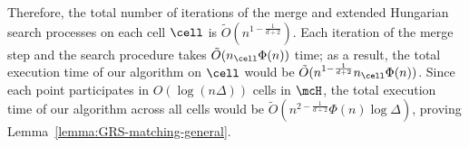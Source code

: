 Therefore, the total number of iterations of the merge and extended Hungarian search processes on each cell $\cell$ is $\tilde{O}(n^{1-\frac{1}{d+2}})$. Each iteration of the merge step and the search procedure takes $\tilde{O}(n_\cell\Phi(n))$ time; as a result, the total execution time of our algorithm on $\cell$ would be $\tilde{O}(n^{1-\frac{1}{d+2}}n_\cell\Phi(n))$. Since each point participates in $O(\log(n\Delta))$ cells in $\mcH$, the total execution time of our algorithm across all cells would be $\tilde{O}(n^{2-\frac{1}{d+2}}\Phi(n)\log\Delta)$, proving Lemma~\ref{lemma:GRS-matching-general}.

%

%
%


%
%
%
%
%
%
%
%
%
%
%
%
%
%

%


